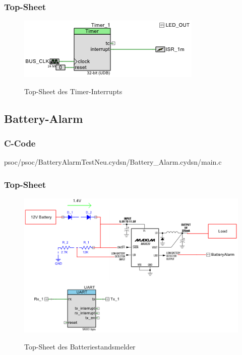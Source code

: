 \documentclass[12pt,a4paper,german]{article}
\begin{document}
\subsubsection{Top-Sheet}
	 
 \begin{figure}[H]
	\centering
	\includegraphics[width=\textwidth]{pictures/topsch_timer_int.png}
	\label{fig:topsch_timer_int}
	\caption{Top-Sheet des Timer-Interrupts}
\end{figure}

	
\subsection{Battery-Alarm}

\subsubsection{C-Code}


	{psoc/psoc/BatteryAlarmTestNeu.cydsn/Battery_Alarm.cydsn/main.c}

\subsubsection{Top-Sheet}
	 
 \begin{figure}[H]
	
	\centering
	\includegraphics[width=\textwidth]{pictures/topsch_battery.png}
	\label{fig:topsch_batter}
	\caption{Top-Sheet des Batteriestandsmelder}

\end{figure}
\end{document}
